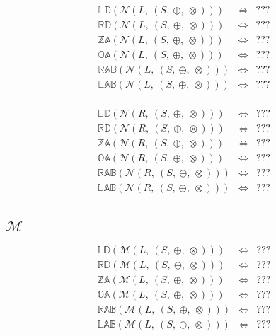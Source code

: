 \documentclass[10pt]{article}
\newcommand{\propname}[1]{{\mathbb{#1}}}
\begin{document}
\[
\begin{array}{rcl} 
\propname{LD}(\mathcal{N}(L,\ (S,\ \oplus,\ \otimes))) 
    & \Leftrightarrow 
    & ???
    \\ 
\propname{RD}(\mathcal{N}(L,\ (S,\ \oplus,\ \otimes))) 
    & \Leftrightarrow 
    & ???
    \\ 
\propname{ZA}(\mathcal{N}(L,\ (S,\ \oplus,\ \otimes))) 
    & \Leftrightarrow 
    & ???
    \\ 
\propname{OA}(\mathcal{N}(L,\ (S,\ \oplus,\ \otimes))) 
    & \Leftrightarrow 
    & ???
    \\ 
\propname{RAB}(\mathcal{N}(L,\ (S,\ \oplus,\ \otimes))) 
    & \Leftrightarrow 
    & ???
    \\ 
\propname{LAB}(\mathcal{N}(L,\ (S,\ \oplus,\ \otimes))) 
    & \Leftrightarrow 
    & ???
    \\ 
\end{array} 
\] 


\[
\begin{array}{rcl} 
\propname{LD}(\mathcal{N}(R,\ (S,\ \oplus,\ \otimes))) 
    & \Leftrightarrow 
    & ???
    \\ 
\propname{RD}(\mathcal{N}(R,\ (S,\ \oplus,\ \otimes))) 
    & \Leftrightarrow 
    & ???
    \\ 
\propname{ZA}(\mathcal{N}(R,\ (S,\ \oplus,\ \otimes))) 
    & \Leftrightarrow 
    & ???
    \\ 
\propname{OA}(\mathcal{N}(R,\ (S,\ \oplus,\ \otimes))) 
    & \Leftrightarrow 
    & ???
    \\ 
\propname{RAB}(\mathcal{N}(R,\ (S,\ \oplus,\ \otimes))) 
    & \Leftrightarrow 
    & ???
    \\ 
\propname{LAB}(\mathcal{N}(R,\ (S,\ \oplus,\ \otimes))) 
    & \Leftrightarrow 
    & ???
    \\ 
\end{array} 
\] 


\subsection{$\mathcal{M}$} 

\[
\begin{array}{rcl} 
\propname{LD}(\mathcal{M}(L,\ (S,\ \oplus,\ \otimes))) 
    & \Leftrightarrow 
    & ???
    \\ 
\propname{RD}(\mathcal{M}(L,\ (S,\ \oplus,\ \otimes))) 
    & \Leftrightarrow 
    & ???
    \\ 
\propname{ZA}(\mathcal{M}(L,\ (S,\ \oplus,\ \otimes))) 
    & \Leftrightarrow 
    & ???
    \\ 
\propname{OA}(\mathcal{M}(L,\ (S,\ \oplus,\ \otimes))) 
    & \Leftrightarrow 
    & ???
    \\ 
\propname{RAB}(\mathcal{M}(L,\ (S,\ \oplus,\ \otimes))) 
    & \Leftrightarrow 
    & ???
    \\ 
\propname{LAB}(\mathcal{M}(L,\ (S,\ \oplus,\ \otimes))) 
    & \Leftrightarrow 
    & ???
    \\ 
\end{array} 
\] 
\end{document}
